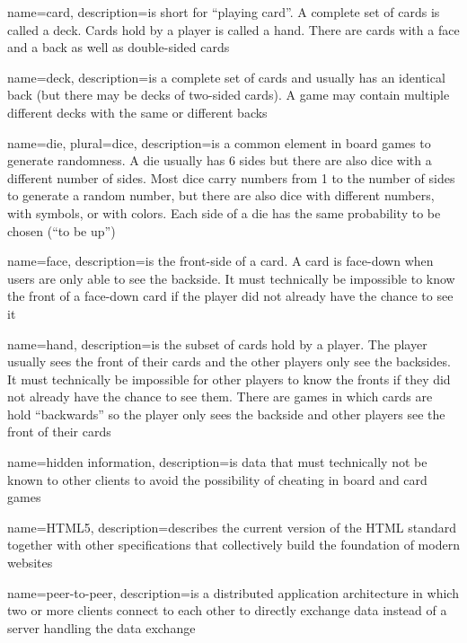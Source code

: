 
{
  name=card,
  description={is short for “playing card”. A complete set of cards is called
  a \gls{deck}. Cards hold by a player is called a \gls{hand}. There are cards
  with a \gls{face} and a back as well as double-sided cards}
}

{
  name=deck,
  description={is a complete set of cards and usually has an identical
  back (but there may be decks of two-sided cards). A game may contain
  multiple different decks with the same or different backs}
}

{
  name=die,
  plural=dice,
  description={is a common element in board games to generate randomness. A die
  usually has 6 sides but there are also dice with a different number of sides.
  Most dice carry numbers from 1 to the number of sides to generate a random
  number, but there are also dice with different numbers, with symbols, or with
  colors. Each side of a die has the same probability to be chosen (“to be
  up”)}
}

{
  name=face,
  description={is the front-side of a \gls{card}. A card is face-down when users
  are only able to see the backside. It must technically be impossible to know
  the front of a face-down card if the player did not already have the chance
  to see it}
}

{
  name=hand,
  description={is the subset of cards hold by a player. The player usually sees
  the front of their cards and the other players only see the backsides. It must
  technically be impossible for other players to know the fronts if they did
  not already have the chance to see them. There are games in which cards are
  hold “backwards” so the player only sees the backside and other players see
  the front of their cards}
}

{
  name={hidden information},
  description={is data that must technically not be known to other clients to
  avoid the possibility of cheating in board and card games}
}

{
  name=HTML5,
  description={describes the current version of the HTML standard together with
  other specifications that collectively build the foundation of modern
  websites}
}

{
  name=peer-to-peer,
  description={is a distributed application architecture in which two or more
  clients connect to each other to directly exchange data instead of a server
  handling the data exchange}
}

